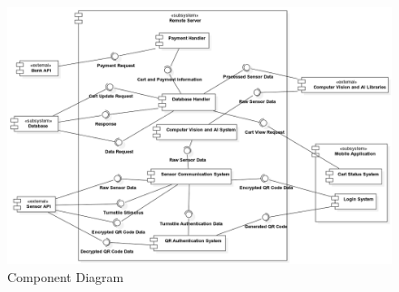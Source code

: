 \documentclass[11pt]{article}
\begin{document}
        \begin{center}
            \begin{figure}[H]
                \includegraphics[width=\linewidth]{Images/ComponentDiagram.png}
                \caption{Component Diagram}
                \label{componentDia}
            \end{figure}
        \end{center}
\end{document}
